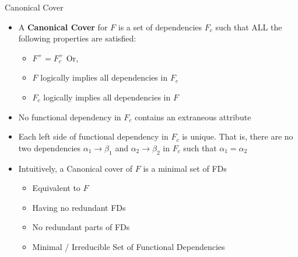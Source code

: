 \documentclass[aspectratio=169, xcolor=dvipsnames]{beamer}
\begin{document}
\begin{frame}{Canonical Cover}
    \begin{itemize}[<+->]
        \item A \textbf{Canonical Cover} for $F$ is a set of dependencies $F_c$ such that ALL the following properties are satisfied:
        \begin{itemize}
            \item[$\triangleright$] $F^+ = F_c^+$ Or,
            \item[$\triangleright$] $F$ logically implies all dependencies in $F_c$
            \item[$\triangleright$] $F_c$ logically implies all dependencies in $F$
        \end{itemize}
        \item No functional dependency in $F_c$ contains an extraneous attribute
        \item Each left side of functional dependency in $F_c$ is unique. That is, there are no two dependencies $\alpha_1 \rightarrow \beta_1$ and $\alpha_2 \rightarrow \beta_2$ in $F_c$ such that $\alpha_1 = \alpha_2$
        \item Intuitively, a Canonical cover of $F$ is a minimal set of FDs
        \begin{itemize}
            \item[$\triangleright$] Equivalent to $F$
            \item[$\triangleright$] Having no redundant FDs
            \item[$\triangleright$] No redundant parts of FDs
            \item[$\triangleright$] Minimal / Irreducible Set of Functional Dependencies
        \end{itemize}
    \end{itemize}
\end{frame}
\end{document}

